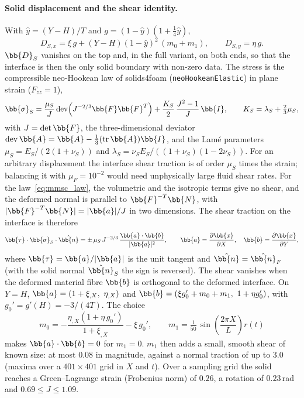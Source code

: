 \paragraph{Solid displacement and the shear identity.}
With $\hat{y} = (Y - H)/T$ and $g = (1 - \hat{y})(1 + \tfrac14\hat{y})$,
\begin{equation}
  D_{S,x} = \xi\,g + (Y - H)(1 - \hat{y})^2\,(m_0 + m_1), \qquad
  D_{S,y} = \eta\,g .
  \label{eq:mmsc_DS}
\end{equation}
$\bb{D}_S$ vanishes on the top and, in the full variant, on both ends, so that the interface is then the only solid boundary with non-zero data.
The stress is the compressible neo-Hookean law of solids4foam (\texttt{neoHookeanElastic}) in plane strain ($F_{zz} = 1$),
\begin{equation}
  \bb{\sigma}_S = \frac{\mu_S}{J}\,\mathrm{dev}\!\left(J^{-2/3}\bb{F}\bb{F}^T\right) + \frac{K_S}{2}\,\frac{J^2 - 1}{J}\,\bb{I},
  \qquad K_S = \lambda_S + \tfrac{2}{3}\mu_S ,
  \label{eq:mmsc_law}
\end{equation}
with $J = \det\bb{F}$, the three-dimensional deviator $\mathrm{dev}\,\bb{A} = \bb{A} - \tfrac13(\mathrm{tr}\,\bb{A})\bb{I}$, and the Lam\'e parameters $\mu_S = E_S/(2(1+\nu_S))$ and $\lambda_S = \nu_S E_S/((1+\nu_S)(1-2\nu_S))$.
For an arbitrary displacement the interface shear traction is of order $\mu_S$ times the strain; balancing it with $\mu_F = 10^{-2}$ would need unphysically large fluid shear rates.
For the law~\eqref{eq:mmsc_law}, the volumetric and the isotropic terms give no shear, and the deformed normal is parallel to $\bb{F}^{-T}\bb{N}$, with $|\bb{F}^{-T}\bb{N}| = |\bb{a}|/J$ in two dimensions.
The shear traction on the interface is therefore
\begin{equation}
  \bb{\tau}\cdot\bb{\sigma}_S\cdot\hat{\bb{n}} = \pm\,\mu_S\,J^{-2/3}\,\frac{\bb{a}\cdot\bb{b}}{|\bb{a}|^2},
  \qquad
  \bb{a} = \frac{\partial\bb{x}}{\partial X}, \quad \bb{b} = \frac{\partial\bb{x}}{\partial Y},
  \label{eq:mmsc_shear}
\end{equation}
where $\bb{\tau} = \bb{a}/|\bb{a}|$ is the unit tangent and $\hat{\bb{n}} = \hat{\bb{n}}_F$ (with the solid normal $\hat{\bb{n}}_S$ the sign is reversed).
The shear vanishes when the deformed material fibre $\bb{b}$ is orthogonal to the deformed interface.
On $Y = H$, $\bb{a} = (1 + \xi_{,X},\ \eta_{,X})$ and $\bb{b} = (\xi g_0' + m_0 + m_1,\ 1 + \eta g_0')$, with $g_0' = g'(H) = -3/(4T)$.
The choice
\begin{equation}
  m_0 = -\frac{\eta_{,X}\left(1 + \eta\,g_0'\right)}{1 + \xi_{,X}} - \xi\,g_0', \qquad
  m_1 = \tfrac{1}{50}\,\sin\!\left(\frac{2\pi X}{L}\right) r(t)
  \label{eq:mmsc_m}
\end{equation}
makes $\bb{a}\cdot\bb{b} = 0$ for $m_1 = 0$.
$m_1$ then adds a small, smooth shear of known size: at most $0.08$ in magnitude, against a normal traction of up to $3.0$ (maxima over a $401\times401$ grid in $X$ and $t$).
Over a sampling grid the solid reaches a Green--Lagrange strain (Frobenius norm) of $0.26$, a rotation of $0.23$\,rad and $0.69 \le J \le 1.09$.

